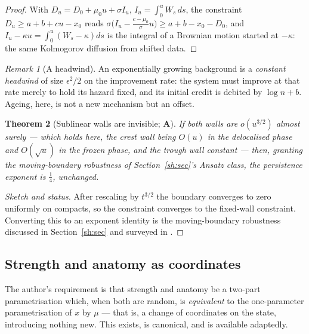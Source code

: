 \documentclass[11pt]{article}
\numberwithin{equation}{section}
\theoremstyle{plain}
\newtheorem{theorem}{Theorem}[section]
\theoremstyle{definition}
\theoremstyle{remark}
\newtheorem{remark}[theorem]{Remark}
\begin{document}
\begin{proof}
With $D_u=D_0+\mu_0u+\sigma I_u$, $I_u=\int_0^u W_s\,ds$, the constraint
$D_u\ge a+b+cu-x_0$ reads
$\sigma\bigl(I_u-\tfrac{c-\mu_0}{\sigma}u\bigr)\ge a+b-x_0-D_0$, and
$I_u-\kappa u=\int_0^u(W_s-\kappa)ds$ is the integral of a Brownian
motion started at $-\kappa$: the same Kolmogorov diffusion from shifted
data.
\end{proof}

\begin{remark}[A headwind]\label{tc:rem:headwind}
An exponentially growing background is a \emph{constant headwind} of
size $\epsilon^{2}/2$ on the improvement rate: the system must improve
at that rate merely to hold its hazard fixed, and its initial credit is
debited by $\log n+b$. Ageing, here, is not a new mechanism but an
offset.
\end{remark}

\begin{theorem}[Sublinear walls are invisible; \textbf{A}]
\label{tc:thm:sublinear}
If both walls are $o(u^{3/2})$ almost surely --- which holds here, the
crest wall being $O(u)$ in the delocalised phase and $O(\sqrt u)$ in the
frozen phase, and the trough wall constant --- then, granting the
moving-boundary robustness of Section~\ref{sh:sec}'s Ansatz class, the
persistence exponent is $\tfrac14$, unchanged.
\end{theorem}

\begin{proof}[Sketch and status]
After rescaling by $t^{3/2}$ the boundary converges to zero uniformly on
compacts, so the constraint converges to the fixed-wall constraint.
Converting this to an exponent identity is the moving-boundary
robustness discussed in Section~\ref{sh:sec} and surveyed in \cite{AS15}.
\end{proof}

\subsection{Strength and anatomy as coordinates}\label{tc:sub:polar}

The author's requirement is that strength and anatomy be a two-part
parametrisation which, when both are random, is \emph{equivalent} to the
one-parameter parametrisation of $x$ by $\mu$ --- that is, a change of
coordinates on the state, introducing nothing new. This exists, is
canonical, and is available adaptedly.
\end{document}
